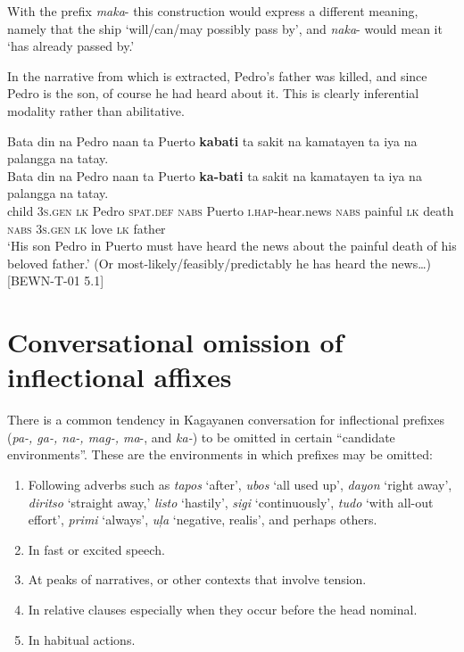 With the prefix \textit{maka}- this construction would express a different meaning, namely that the ship ‘will/can/may possibly pass by’, and \textit{naka}- would mean it ‘has already passed by.’

In the narrative from which  is extracted, Pedro’s father was killed, and since Pedro is the son, of course he had heard about it. This is clearly inferential modality rather than abilitative.

\ea
\label{bkm:Ref396802277}
Bata  din  na  Pedro  naan  ta  Puerto  \textbf{kabati} ta  sakit  na  kamatayen  ta  iya  na  palangga  na  tatay. \\\smallskip
 \gll Bata  din  na  Pedro  naan  ta  Puerto  \textbf{ka-bati} ta  sakit  na  kamatayen  ta  iya  na  palangga  na  tatay. \\
child  3\textsc{s.gen}  \textsc{lk}  Pedro  \textsc{spat.def}  \textsc{nabs} Puerto  \textsc{i.hap}-hear.news
\textsc{nabs} painful  \textsc{lk} death  \textsc{nabs}  3\textsc{s.gen}  \textsc{lk}  love  \textsc{lk} father \\
\glt `His son Pedro in Puerto must have heard the news about the painful death of his beloved father.’ (Or most-likely/feasibly/predictably he has heard the news…) [BEWN-T-01 5.1]
\z

\section{Conversational omission of inflectional affixes}
\label{bkm:Ref120017222}\label{bkm:Ref119308716} \label{sec:omissionofaffixes} \label{sec:omissionofprefixes} 

There is a common tendency in Kagayanen conversation for inflectional prefixes (\textit{pa-, ga-, na-, mag-, ma}{}-, and \textit{ka-}) to be omitted in certain “candidate environments”. These are the environments in which prefixes may be omitted:

\begin{enumerate}
\item
Following adverbs such as \textit{tapos} ‘after’, \textit{ubos} ‘all used up’, \textit{dayon} ‘right away’, \textit{diritso} ‘straight away,’ \textit{listo} ‘hastily’, \textit{sigi} ‘continuously’, \textit{tudo} ‘with all-out effort’, \textit{primi} ‘always’, \textit{uļa} ‘negative, realis’, and perhaps others.
\item 
In fast or excited speech.
\item
At peaks of narratives, or other contexts that involve tension.
\item
In relative clauses especially when they occur before the head nominal.
\item
In habitual actions.
\end{enumerate}

